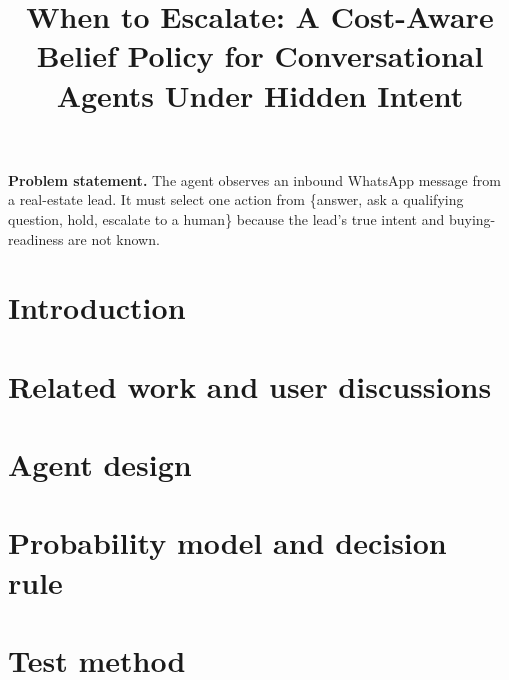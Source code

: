 \documentclass[11pt,a4paper]{article}
\title{When to Escalate: A Cost-Aware Belief Policy for Conversational Agents
Under Hidden Intent}
\author{}
\date{}
\begin{document}
\maketitle

\begin{abstract}
\end{abstract}

\noindent\textbf{Problem statement.}
The agent observes an inbound WhatsApp message from a real-estate lead. It must
select one action from \{answer, ask a qualifying question, hold, escalate to a
human\} because the lead's true intent and buying-readiness are not known.


\section{Introduction}

\section{Related work and user discussions}

\section{Agent design}

\section{Probability model and decision rule}

\section{Test method}
\end{document}

